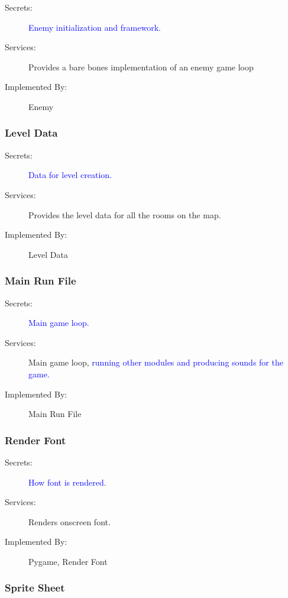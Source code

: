 \documentclass[12pt, titlepage]{article}
\begin{document}
\begin{description}
  \item[Secrets:] \textcolor{blue}{Enemy initialization and framework.}
  \item[Services:] Provides a bare bones implementation of an enemy game loop
  \item[Implemented By:] Enemy
\end{description}

\subsubsection{Level Data}

\begin{description}
  \item[Secrets:] \textcolor{blue}{Data for level creation.}
  \item[Services:] Provides the level data for all the rooms on the map.
  \item[Implemented By:] Level Data
\end{description}

\subsubsection{Main Run File}

\begin{description}
  \item[Secrets:] \textcolor{blue}{Main game loop.}
  \item[Services:] Main game loop, \textcolor{blue}{running other modules and producing sounds for the game.}
  \item[Implemented By:] Main Run File
\end{description}

\subsubsection{Render Font}

\begin{description}
  \item[Secrets:] \textcolor{blue}{How font is rendered.}
  \item[Services:] Renders onscreen font.
  \item[Implemented By:] Pygame, Render Font
\end{description}

\subsubsection{Sprite Sheet}
\end{document}
